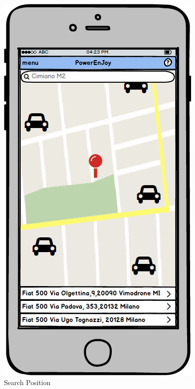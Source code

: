 \documentclass[a4paper,11pt]{article}
\begin{document}
\begin{itemize}
\begin{figure}[H]
  \begin{minipage}[t]{.35\linewidth}
    \includegraphics[width=\textwidth]{images/search}
  \caption{Search Position}\label{fig-search}
  \end{minipage}  
\end{figure}


\end{itemize}
\end{document}
